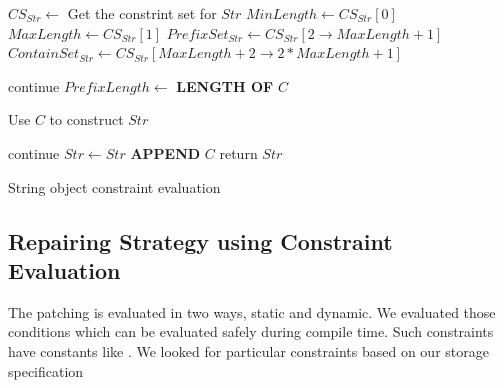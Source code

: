 \begin{algorithm}
\scriptsize
\DontPrintSemicolon
{}
\Begin
{
 $CS_{Str} \longleftarrow$ Get the constrint set for $Str$\;
 $MinLength \longleftarrow CS_{Str}[0]$\;
 $MaxLength \longleftarrow CS_{Str}[1]$\;
 $PrefixSet_{Str} \longleftarrow CS_{Str}[2 \rightarrow MaxLength + 1]$\;
 $ContainSet_{Str} \longleftarrow CS_{Str}[MaxLength +2  \rightarrow 2*MaxLength
 + 1]$\;
 
  {
   {
    continue\;
   }
   $PrefixLength \longleftarrow$ {\bf LENGTH OF} $C$\;
   
   {
     Use $C$ to construct $Str$\;
   }
  }
 
  {
   {
    continue\;
   }
   $Str \leftarrow Str$ {\bf APPEND} $C$\;
  }
  return $Str$\;
}
\caption{String object constraint evaluation}
 \label{algo:constraint}
\end{algorithm}

\subsection{Repairing Strategy using Constraint Evaluation}
\label{subsubsec:repairingStrategyConstraint}

The patching is evaluated in two ways, static and dynamic. We evaluated those
conditions which can be evaluated safely during compile time. Such constraints
have constants like . We looked for particular
constraints based on our storage specification 
